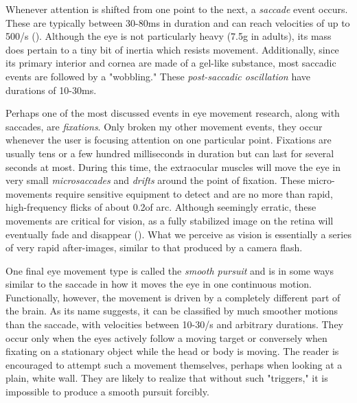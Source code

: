 Whenever attention is shifted from one point to the next, a \textit{saccade} event occurs. These are typically between 30-80ms in duration and can reach velocities of up to 500\degree/s (\cite{holmqvist2011}). Although the eye is not particularly heavy (7.5g in adults), its mass does pertain to a tiny bit of inertia which resists movement. Additionally, since its primary interior and cornea are made of a gel-like substance, most saccadic events are followed by a "wobbling." These \textit{post-saccadic oscillation} have durations of 10-30ms.


Perhaps one of the most discussed events in eye movement research, along with saccades, are \textit{fixations}. Only broken my other movement events, they occur whenever the user is focusing attention on one particular point. Fixations are usually tens or a few hundred milliseconds in duration but can last for several seconds at most. During this time, the extraocular muscles will move the eye in very small \textit{microsaccades} and \textit{drifts} around the point of fixation. These micro-movements require sensitive equipment to detect and are no more than rapid, high-frequency flicks of about 0.2\degree of arc. Although seemingly erratic, these movements are critical for vision, as a fully stabilized image on the retina will eventually fade and disappear (\cite{oyster1999}). What we perceive as vision is essentially a series of very rapid after-images, similar to that produced by a camera flash.

One final eye movement type is called the \textit{smooth pursuit} and is in some ways similar to the saccade in how it moves the eye in one continuous motion. Functionally, however, the movement is driven by a completely different part of the brain. As its name suggests, it can be classified by much smoother motions than the saccade, with velocities between 10-30\degree/s and arbitrary durations. They occur only when the eyes actively follow a moving target or conversely when fixating on a stationary object while the head or body is moving. The reader is encouraged to attempt such a movement themselves, perhaps when looking at a plain, white wall. They are likely to realize that without such "triggers," it is impossible to produce a smooth pursuit forcibly.










